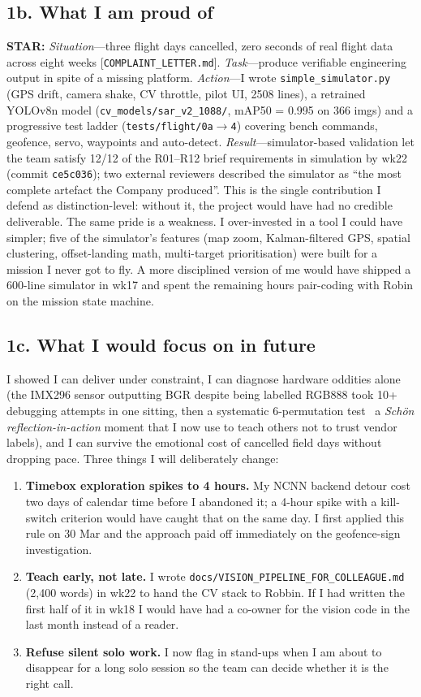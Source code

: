 \subsection*{1b. What I am proud of }
\www \textbf{STAR:} \emph{Situation}---three flight days cancelled, zero seconds of real flight data across eight weeks [\texttt{COMPLAINT\_LETTER.md}]. \emph{Task}---produce verifiable engineering output in spite of a missing platform. \emph{Action}---I wrote \texttt{simple\_simulator.py} (GPS drift, camera shake, CV throttle, pilot UI, 2508 lines), a retrained YOLOv8n model (\texttt{cv\_models/sar\_v2\_1088/}, mAP50 = 0.995 on 366 imgs) and a progressive test ladder (\texttt{tests/flight/0a}$\to$\texttt{4}) covering bench commands, geofence, servo, waypoints and auto-detect. \emph{Result}---simulator-based validation let the team satisfy 12/12 of the R01--R12 brief requirements in simulation by wk22 (commit \texttt{ce5c036}); two external reviewers described the simulator as ``the most complete artefact the Company produced''. This is the single contribution I defend as distinction-level: without it, the project would have had no credible deliverable.
\ebi The same pride is a weakness. I over-invested in a tool I could have simpler; five of the simulator's features (map zoom, Kalman-filtered GPS, spatial clustering, offset-landing math, multi-target prioritisation) were built for a mission I never got to fly. A more disciplined version of me would have shipped a 600-line simulator in wk17 and spent the remaining hours pair-coding with Robin on the mission state machine.

\subsection*{1c. What I would focus on in future }
\www I showed I can deliver under constraint, I can diagnose hardware oddities alone (the IMX296 sensor outputting BGR despite being labelled RGB888 took 10+ debugging attempts in one sitting, then a systematic 6-permutation test~\textemdash{} a \emph{Sch{\"o}n reflection-in-action} moment that I now use to teach others not to trust vendor labels), and I can survive the emotional cost of cancelled field days without dropping pace.
\ebi Three things I will deliberately change:
\begin{enumerate}
\item \textbf{Timebox exploration spikes to 4 hours.} My NCNN backend detour cost two days of calendar time before I abandoned it; a 4-hour spike with a kill-switch criterion would have caught that on the same day. I first applied this rule on 30 Mar and the approach paid off immediately on the geofence-sign investigation.
\item \textbf{Teach early, not late.} I wrote \texttt{docs/VISION\_PIPELINE\_FOR\_COLLEAGUE.md} (2{,}400 words) in wk22 to hand the CV stack to Robbin. If I had written the first half of it in wk18 I would have had a co-owner for the vision code in the last month instead of a reader.
\item \textbf{Refuse silent solo work.} I now flag in stand-ups when I am about to disappear for a long solo session so the team can decide whether it is the right call.
\end{enumerate}
